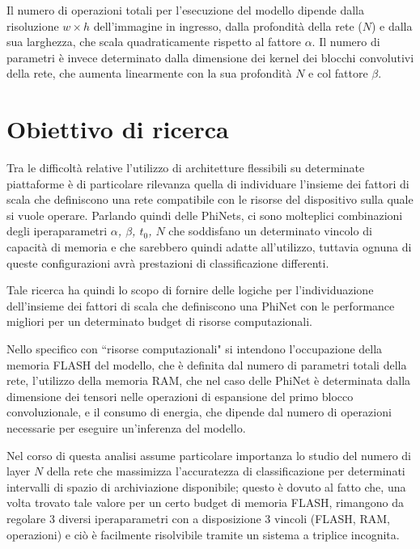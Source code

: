 Il numero di operazioni totali per l'esecuzione del modello dipende dalla risoluzione $w \times h$ dell'immagine in ingresso, dalla profondità della rete ($N$) e dalla sua larghezza, che scala quadraticamente rispetto al fattore $\alpha$. 
Il numero di parametri è invece determinato dalla dimensione dei kernel dei blocchi convolutivi della rete, che aumenta linearmente con la sua profondità $N$ e col fattore $\beta$.

\section{Obiettivo di ricerca}
\label{sec:ricerca}

Tra le difficoltà relative l'utilizzo di architetture flessibili su determinate piattaforme è di particolare rilevanza quella di individuare l'insieme dei fattori di scala che definiscono una rete compatibile con le risorse del dispositivo sulla quale si vuole operare. 
Parlando quindi delle PhiNets, ci sono molteplici combinazioni degli iperaparametri \textit{$\alpha$, $\beta$, $t_{0}$, $N$} che soddisfano un determinato vincolo di capacità di memoria e che sarebbero quindi adatte all'utilizzo, tuttavia ognuna di queste configurazioni avrà prestazioni di classificazione differenti.

Tale ricerca ha quindi lo scopo di fornire delle logiche per l'individuazione dell'insieme dei fattori di scala che definiscono una PhiNet con le performance migliori per un determinato budget di risorse computazionali.

Nello specifico con ``risorse computazionali" si intendono l'occupazione della memoria FLASH del modello, che è definita dal numero di parametri totali della rete, l'utilizzo della memoria RAM, che nel caso delle PhiNet è determinata dalla dimensione dei tensori nelle operazioni di espansione del primo blocco convoluzionale, e il consumo di energia, che dipende dal numero di operazioni necessarie per eseguire un'inferenza del modello.

Nel corso di questa analisi assume particolare importanza lo studio del numero di layer $N$ della rete che massimizza l'accuratezza di classificazione per determinati intervalli di spazio di archiviazione disponibile; questo è dovuto al fatto che, una volta trovato tale valore per un certo budget di memoria FLASH, rimangono da regolare 3 diversi iperaparametri con a disposizione 3 vincoli (FLASH, RAM, operazioni) e ciò è facilmente risolvibile tramite un sistema a triplice incognita.

